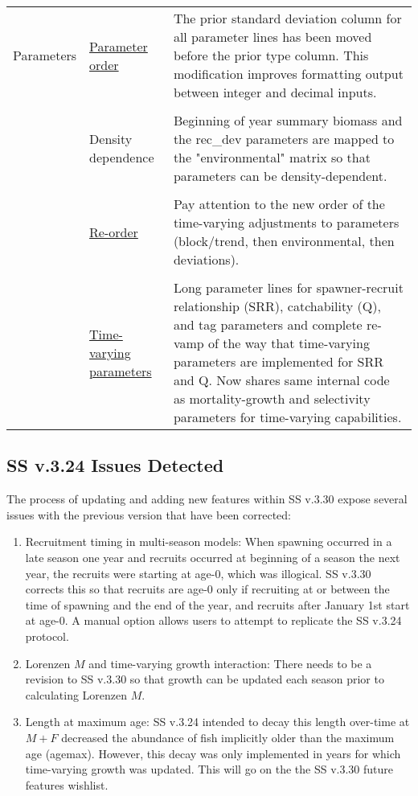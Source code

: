 \begin{center}
\begin{longtable}{p{2cm} p{3cm} p{10cm}}
				\hline
				Parameters 
					& \hyperlink{paraOrder}{Parameter order} & The prior standard deviation column for all parameter lines has been moved before the prior type column.  This modification improves formatting output between integer and decimal inputs.\\ 
				 \\
					& Density dependence & 
						Beginning of year summary biomass and the rec\_dev parameters are mapped to the "environmental" matrix so that parameters can be density-dependent.\\
				  \\						
					& \hyperlink{tvOrder}{Re-order} & 
						Pay attention to the new order of the time-varying adjustments to parameters (block/trend, then environmental, then deviations). \\
				  \\						
					& \hyperlink{time-vary}{Time-varying parameters} & 
						Long parameter lines for spawner-recruit relationship (SRR), catchability (Q), and tag parameters and complete re-vamp of the way that time-varying parameters are implemented for SRR and Q.  Now shares same internal code as mortality-growth and selectivity parameters for time-varying capabilities.\\
				\hline	
			\end{longtable}
		\end{center}
		
\subsection{SS v.3.24 Issues Detected}
The process of updating and adding new features within SS v.3.30 expose several issues with the previous version that have been corrected:
\begin{enumerate}
	\item Recruitment timing in multi-season models: When spawning occurred in a late season one year and recruits occurred at beginning of a season the next year, the recruits were starting at age-0, which was illogical.  SS v.3.30 corrects this so that recruits are age-0 only if recruiting at or between the time of spawning and the end of the year, and recruits after January 1st start at age-0.  A manual option allows users to attempt to replicate the SS v.3.24 protocol.
	\item Lorenzen $M$ and time-varying growth interaction: There needs to be a revision to SS v.3.30 so that growth can be updated each season prior to calculating Lorenzen $M$.
	\item Length at maximum age: SS v.3.24 intended to decay this length over-time at $M + F$ decreased the abundance of fish implicitly older than the maximum age (agemax).  However, this decay was only implemented in years for which time-varying growth was updated.  This will go on the the SS v.3.30 future features wishlist.
\end{enumerate}

